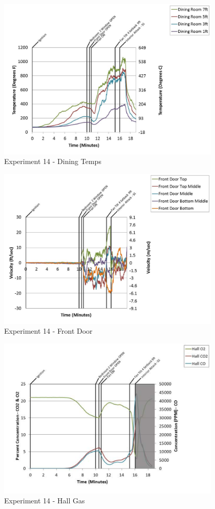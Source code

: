 \documentclass{article}
\begin{document}
\begin{appendices}
	\begin{figure}[h!]
		\centering
		\includegraphics[height=3.05in]{0_Images/Results_Charts/Exp_14_Charts/DiningTemps.pdf}
		\caption{Experiment 14 - Dining Temps}
	\end{figure}
 
	\clearpage

	\begin{figure}[h!]
		\centering
		\includegraphics[height=3.05in]{0_Images/Results_Charts/Exp_14_Charts/FrontDoor.pdf}
		\caption{Experiment 14 - Front Door}
	\end{figure}
 

	\begin{figure}[h!]
		\centering
		\includegraphics[height=3.05in]{0_Images/Results_Charts/Exp_14_Charts/HallGas.pdf}
		\caption{Experiment 14 - Hall Gas}
	\end{figure}
 

\end{appendices}
\end{document}
